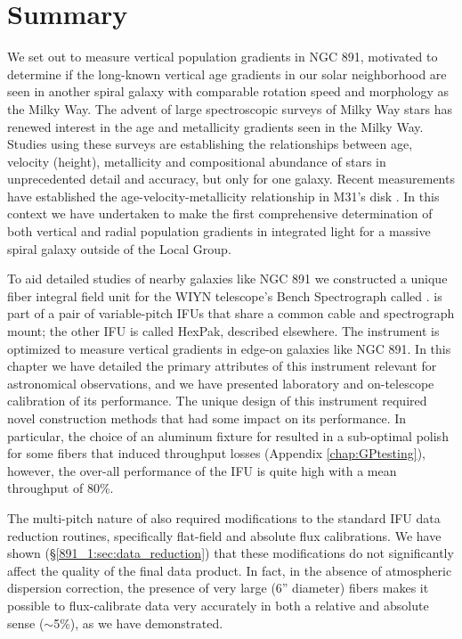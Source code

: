 \section{Summary}
\label{891_1:sec:summary}

We set out to measure vertical population gradients in NGC 891,
motivated to determine if the long-known vertical age gradients in our
solar neighborhood are seen in another spiral galaxy with comparable
rotation speed and morphology as the Milky Way.  The advent of large
spectroscopic surveys of Milky Way stars has renewed interest in the
age and metallicity gradients seen in the Milky Way. Studies using
these surveys \citep[e.g.,][]{Bovy12c,Hayden14,Hayden15} are
establishing the relationships between age, velocity (height),
metallicity and compositional abundance of stars in unprecedented
detail and accuracy, but only for one galaxy.  Recent measurements
have established the age-velocity-metallicity relationship in M31's
disk \citep{Dorman15}. In this context we have undertaken to make the
first comprehensive determination of both vertical and radial
population gradients in integrated light for a massive spiral galaxy
outside of the Local Group.

To aid detailed studies of nearby galaxies like NGC 891 we constructed
a unique fiber integral field unit for the WIYN telescope's Bench
Spectrograph called \GP. \GP is part of a pair of variable-pitch IFUs
that share a common cable and spectrograph mount; the other IFU is
called HexPak, described elsewhere.  The \GP instrument is optimized
to measure vertical gradients in edge-on galaxies like NGC 891. In
this chapter we have detailed the primary attributes of this
instrument relevant for astronomical observations, and we have
presented laboratory and on-telescope calibration of its performance.
The unique design of this instrument required novel construction
methods that had some impact on its performance. In particular, the
choice of an aluminum fixture for \GP resulted in a sub-optimal polish
for some fibers that induced throughput losses (Appendix
\ref{chap:GPtesting}), however, the over-all performance of the IFU is
quite high with a mean throughput of 80\%.

The multi-pitch nature of \GP also required modifications to the
standard IFU data reduction routines, specifically flat-field and
absolute flux calibrations. We have shown (\S\ref{891_1:sec:data_reduction})
that these modifications do not significantly affect the quality of
the final data product. In fact, in the absence of atmospheric
dispersion correction, the presence of very large (6'' diameter)
fibers makes it possible to flux-calibrate \GP data very accurately in
both a relative and absolute sense ($\sim$5\%), as we have
demonstrated.

